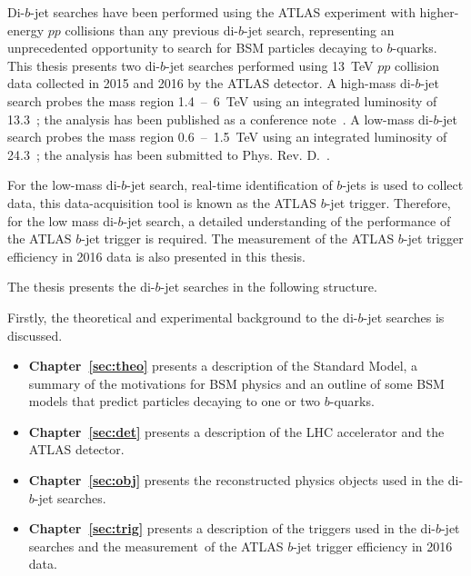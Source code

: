 Di-$b$-jet searches have been performed using the ATLAS experiment
with higher-energy $pp$ collisions than any previous \mbox{di-$b$-jet} search,
representing an unprecedented opportunity to search for BSM particles decaying to $b$-quarks.
This thesis presents two di-$b$-jet searches performed using
13~TeV $pp$ collision data collected in 2015 and 2016 by the ATLAS detector.
A high-mass di-$b$-jet search probes the mass region 1.4~--~6~TeV using an integrated luminosity of 13.3~\ifb{};
the analysis has been published as a conference note~\cite{dibjet-ichep_conf}.
A low-mass di-$b$-jet search probes the mass region 0.6~--~1.5~TeV using an integrated luminosity of 24.3~\ifb{};
the analysis has been submitted to Phys. Rev. D.~\cite{dibjet-full}.

For the low-mass di-$b$-jet search, real-time identification of $b$-jets is used to collect data,
this data-acquisition tool is known as the ATLAS $b$-jet trigger.
Therefore, for the low mass di-$b$-jet search, a detailed understanding of the performance of the ATLAS $b$-jet trigger is required.
The measurement of the ATLAS $b$-jet trigger efficiency in 2016 data is also presented in this thesis.

%
\noindent
The thesis presents the di-$b$-jet searches in the following structure.\vspace{-0.5em}

\noindent
Firstly, the theoretical and experimental background to the di-$b$-jet searches is discussed.
\vspace{-0.5em}
\begin{itemize}[leftmargin=*]
\item\textbf{Chapter~\ref{sec:theo}} presents a description of the Standard Model,
  a summary of the motivations for BSM physics and
  an outline of some BSM models that predict particles
  decaying to one or two $b$-quarks.%
\item\textbf{Chapter~\ref{sec:det}} presents a description of the LHC accelerator and the ATLAS detector.%
\item\textbf{Chapter~\ref{sec:obj}} presents the reconstructed physics objects used in the di-$b$-jet searches. %
\item\textbf{Chapter~\ref{sec:trig}} presents a description of the triggers used in the di-$b$-jet searches
  and the measurement~of the ATLAS $b$-jet trigger efficiency in 2016 data. %
\end{itemize}

